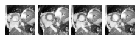 \documentclass[xcolor=svgnames,handout]{beamer}
\begin{document}
\begin{frame}
\begin{itemize}
  \begin{center}
    \includegraphics[width=50]{11.png}
    \hspace{0.15cm}
    \includegraphics[width=50]{13.png}
    \hspace{0.15cm}
    \includegraphics[width=50]{15.png}
    \hspace{0.15cm}
    \includegraphics[width=50]{17.png}

\end{center}
\end{itemize}
\end{frame}
\end{document}
